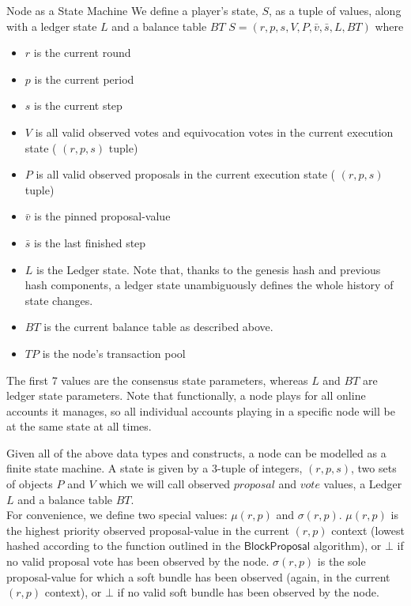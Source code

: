 \documentclass[10pt,a4paper]{article}
\begin{document}
\begin{section}{Node as a State Machine}
We define a player's state, $S$, as a tuple of values, along with a ledger state $L$ and a balance table $BT$
$S = (r, p, s, V, P, \bar{v}, \bar{s}, L, BT)$ where
\begin{itemize}
    \item $r$ is the current round
    \item $p$ is the current period
    \item $s$ is the current step
    \item $V$ is all valid observed votes and equivocation votes in the current execution state ( $(r,p,s)$ tuple)
    \item $P$ is all valid observed proposals in the current execution state ( $(r,p,s)$ tuple)
    \item $\bar{v}$ is the pinned proposal-value
    \item $\bar{s}$ is the last finished step
    \item $L$ is the Ledger state. Note that, thanks to the genesis hash and previous hash components, a ledger state unambiguously
defines the whole history of state changes.
    \item $BT$ is the current balance table as described above.
    \item $TP$ is the node's transaction pool
\end{itemize}
The first 7 values are the consensus state parameters, whereas $L$ and $BT$ are ledger state parameters.
Note that functionally, a node plays for all online accounts it manages, so all individual
accounts playing in a specific node will be at the same state at all times.

Given all of the above data types and constructs, a node can be modelled as 
a finite state machine. A state is given by a 3-tuple of integers, $(r, p, s)$, 
two sets of objects $P$ and $V$ which we will call observed $proposal$ and $vote$ values, 
a Ledger $L$ and a balance table $BT$.
\\

For convenience, we define two special values: $\mu(r,p)$ and $\sigma(r,p)$.
$\mu(r,p)$ is the highest priority observed proposal-value in the current $(r,p)$ context (lowest hashed according to the function outlined
in the $\mathsf{BlockProposal}$ algorithm), or $\bot$ if no valid proposal vote has been observed by the node.
$\sigma(r,p)$ is the sole proposal-value for which a soft bundle has been observed (again, in the current $(r,p)$ context), or $\bot$ if
no valid soft bundle has been observed by the node.



\end{section}
\end{document}
